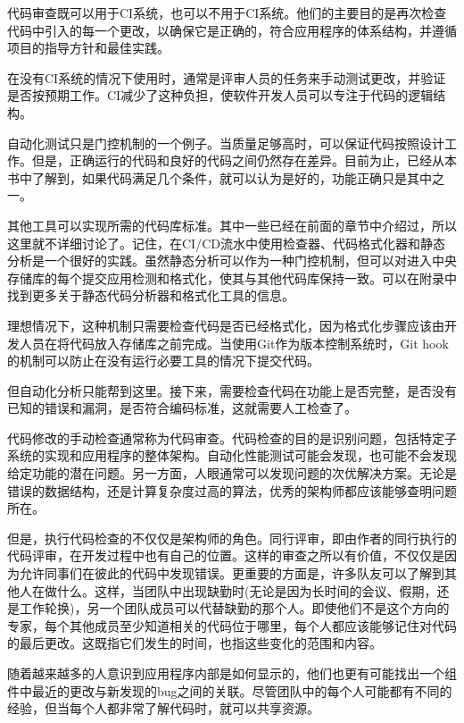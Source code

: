 
代码审查既可以用于CI系统，也可以不用于CI系统。他们的主要目的是再次检查代码中引入的每一个更改，以确保它是正确的，符合应用程序的体系结构，并遵循项目的指导方针和最佳实践。

在没有CI系统的情况下使用时，通常是评审人员的任务来手动测试更改，并验证是否按预期工作。CI减少了这种负担，使软件开发人员可以专注于代码的逻辑结构。


自动化测试只是门控机制的一个例子。当质量足够高时，可以保证代码按照设计工作。但是，正确运行的代码和良好的代码之间仍然存在差异。目前为止，已经从本书中了解到，如果代码满足几个条件，就可以认为是好的，功能正确只是其中之一。

其他工具可以实现所需的代码库标准。其中一些已经在前面的章节中介绍过，所以这里就不详细讨论了。记住，在CI/CD流水中使用检查器、代码格式化器和静态分析是一个很好的实践。虽然静态分析可以作为一种门控机制，但可以对进入中央存储库的每个提交应用检测和格式化，使其与其他代码库保持一致。可以在附录中找到更多关于静态代码分析器和格式化工具的信息。

理想情况下，这种机制只需要检查代码是否已经格式化，因为格式化步骤应该由开发人员在将代码放入存储库之前完成。当使用Git作为版本控制系统时，Git hook的机制可以防止在没有运行必要工具的情况下提交代码。

但自动化分析只能帮到这里。接下来，需要检查代码在功能上是否完整，是否没有已知的错误和漏洞，是否符合编码标准，这就需要人工检查了。


代码修改的手动检查通常称为代码审查。代码检查的目的是识别问题，包括特定子系统的实现和应用程序的整体架构。自动化性能测试可能会发现，也可能不会发现给定功能的潜在问题。另一方面，人眼通常可以发现问题的次优解决方案。无论是错误的数据结构，还是计算复杂度过高的算法，优秀的架构师都应该能够查明问题所在。

但是，执行代码检查的不仅仅是架构师的角色。同行评审，即由作者的同行执行的代码评审，在开发过程中也有自己的位置。这样的审查之所以有价值，不仅仅是因为允许同事们在彼此的代码中发现错误。更重要的方面是，许多队友可以了解到其他人在做什么。这样，当团队中出现缺勤时(无论是因为长时间的会议、假期，还是工作轮换)，另一个团队成员可以代替缺勤的那个人。即使他们不是这个方向的专家，每个其他成员至少知道相关的代码位于哪里，每个人都应该能够记住对代码的最后更改。这既指它们发生的时间，也指这些变化的范围和内容。

随着越来越多的人意识到应用程序内部是如何显示的，他们也更有可能找出一个组件中最近的更改与新发现的bug之间的关联。尽管团队中的每个人可能都有不同的经验，但当每个人都非常了解代码时，就可以共享资源。

